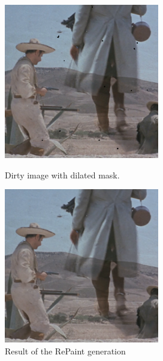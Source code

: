 \documentclass[openany, 12pt]{article}
\begin{document}
\begin{figure}[htbp]
	\centering
	\begin{minipage}{0.45\textwidth}
		\centering
		\includegraphics[width=\textwidth]{images/masked_4.png}
		\caption{\smaller Dirty image with dilated mask.}
	\end{minipage}
	\hspace{0.05\textwidth}
	\begin{minipage}{0.45\textwidth}
		\centering
		\includegraphics[width=\textwidth]{images/inpainted_4.png}
		\caption{Result of the RePaint generation}
	\end{minipage}
\end{figure}
\newpage
\end{document}

